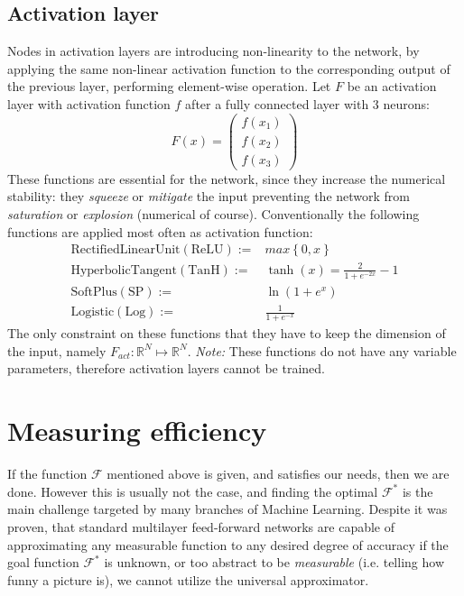 \subsection{Activation layer} 
Nodes in activation layers are introducing non-linearity to the network, 
by applying the same non-linear activation function to the corresponding output of the previous layer, performing element-wise operation.
Let $F$ be an activation layer with activation function $f$ after a fully connected layer with 3 neurons:
\begin{equation*}
    F(x) = \begin{pmatrix}
    f(x_1) \\ 
    f(x_2) \\
    f(x_3)
    \end{pmatrix}
\end{equation*}
These functions are essential for the network, since they increase the numerical stability: they \emph{squeeze} or \emph{mitigate} the input preventing the network from \emph{saturation} or \emph{explosion} (numerical of course). Conventionally the following functions are applied most often as activation function:
\begin{align}
    \mathrm{Rectified Linear Unit (ReLU) := } &max\left\lbrace 0, x \right\rbrace \label{eq:af1} \\
    \mathrm{Hyperbolic Tangent (TanH) := }   &\tanh(x) = \frac{2}{1+e^{-2x}}-1 \label{eq:af2}\\
    \mathrm{SoftPlus (SP) := }   &\ln(1+e^x) \label{eq:af3}\\
    \mathrm{Logistic (Log) := }  &\frac{1}{1+e^{-x}} \label{eq:af4}
\end{align}
The only constraint on these functions that they have to keep the dimension of the input, namely $F_{act}:\mathbb{R}^N \mapsto \mathbb{R}^N$.
\emph{Note:} These functions do not have any variable parameters, therefore activation layers cannot be trained.

\section{Measuring efficiency}
If the function $\mathcal{F}$ mentioned above is given, and satisfies our needs, then we are done.
However this is usually not the case, and finding the optimal $\mathcal{F}^*$ is the main challenge targeted by many branches of Machine Learning.
Despite it was proven, that standard multilayer
feed-forward networks are capable of approximating
any measurable function to any desired degree of
accuracy \cite{hornik1989multilayer}
if the goal function $\mathcal{F}^*$ is unknown, 
or too abstract to be \emph{measurable} (i.e. telling how funny a picture is), 
we cannot utilize the universal approximator.

